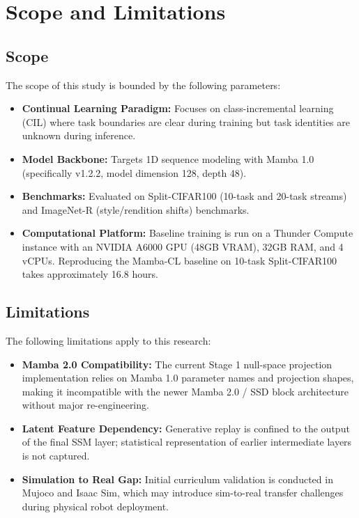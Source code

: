 \section{Scope and Limitations}
\label{sec:scope}

\subsection{Scope}
\label{subsec:scope}

The scope of this study is bounded by the following parameters:
\begin{itemize}
    \item \textbf{Continual Learning Paradigm:} Focuses on class-incremental learning (CIL) \cite{venThreeScenariosContinual2019} where task boundaries are clear during training but task identities are unknown during inference.
    
    \item \textbf{Model Backbone:} Targets 1D sequence modeling with Mamba 1.0 \cite{guMambaLinearTimeSequence2024} (specifically  v1.2.2, model dimension 128, depth 48).
    
    \item \textbf{Benchmarks:} Evaluated on Split-CIFAR100 \cite{venThreeScenariosContinual2019} (10-task and 20-task streams) and ImageNet-R \cite{hendrycksManyFacesRobustness2021} (style/rendition shifts) benchmarks.
    
    \item \textbf{Computational Platform:} Baseline training is run on a Thunder Compute instance with an NVIDIA A6000 GPU (48GB VRAM), 32GB RAM, and 4 vCPUs. Reproducing the Mamba-CL baseline on 10-task Split-CIFAR100 takes approximately 16.8 hours.
\end{itemize}

\subsection{Limitations}
\label{subsec:limitations}

The following limitations apply to this research:
\begin{itemize}
    \item \textbf{Mamba 2.0 Compatibility:} The current Stage 1 null-space projection implementation relies on Mamba 1.0 parameter names and projection shapes, making it incompatible with the newer Mamba 2.0 / SSD block architecture without major re-engineering.
    
    \item \textbf{Latent Feature Dependency:} Generative replay is confined to the output of the final SSM layer; statistical representation of earlier intermediate layers is not captured.
    
    \item \textbf{Simulation to Real Gap:} Initial curriculum validation is conducted in Mujoco and Isaac Sim, which may introduce sim-to-real transfer challenges during physical robot deployment.
\end{itemize}


